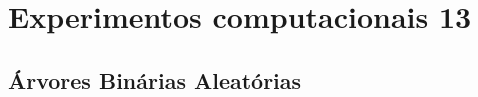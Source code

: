\documentclass[a4paper,12pt]{article}
\begin{document}
\section {Experimentos computacionais 13}

	\subsection{Árvores Binárias Aleatórias}


		 
\end{document}
